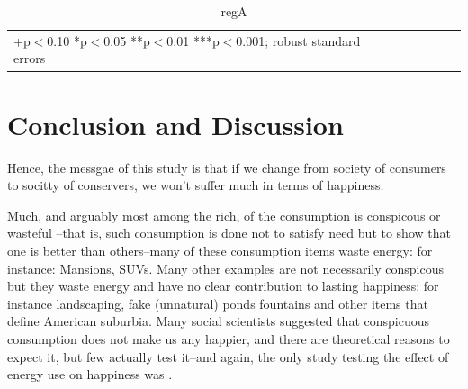 \documentclass[10pt, letterpaper]{article}
\begin{document}
\begin{spacing}{1.4}
\begin{table}[H]\centering \caption{regA} \label{regA} \begin{scriptsize} \begin{tabular}{p{1.4in}p{.43in}p{.43in}p{.43in}p{.43in}p{.43in}p{.43in}p{.43in}p{.43in}p{.43in}p{.43 in}p{.43in}p{.43 in}}\hline  \hline\multicolumn{6}{l}{+p$<$0.10 *p$<$0.05 **p$<$0.01 ***p$<$0.001; robust standard errors} \end{tabular}\end{scriptsize}\end{table}
 

\section{Conclusion and Discussion}

Hence, the messgae of this study is that if we change from society of consumers
to socitty of conservers, we won't suffer much in terms of happiness.

Much, and  arguably most among the rich, of the consumption is conspicous or
wasteful \citep{veblen05a, veblen05b}--that is, such consumption is done not to satisfy need but to show that
one is better than others--many of these consumption items waste energy: for
instance: Mansions, SUVs.  Many other examples are not necessarily conspicous
but they waste energy and have no clear contribution to lasting happiness: for
instance landscaping, fake (unnatural) ponds fountains and other items that
define American suburbia. Many social scientists \citep[e.g.][]{csikszentmihalyi99, frank04, frank05, frank12} suggested that conspicuous consumption
does not make us any happier, and there are theoretical reasons to
expect it, but few actually test it--and again, the only  study testing the
effect of energy use on happiness was \citet{graef81}.


\end{spacing}
\end{document}
